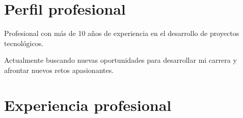 \documentclass[letterpaper]{twentysecondcv} %
\begin{document}
\makeprofile%

\section{Perfil profesional}
Profesional con más de 10 años de experiencia en el desarrollo de proyectos tecnológicos.

Actualmente buscando nuevas oportunidades para desarrollar mi carrera y afrontar nuevos retos apasionantes.


\section{Experiencia profesional}
\end{document}
